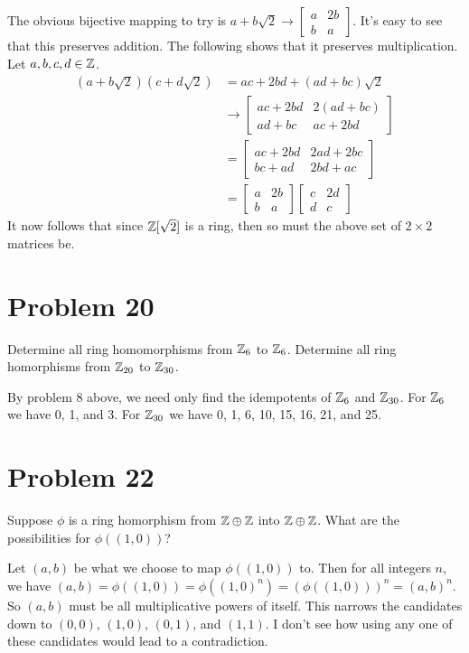 \documentclass{article}
\begin{document}
The obvious bijective mapping to try is $a+b\sqrt{2}\to\left[\begin{array}{cc}a&2b\\b&a\end{array}\right]$.
It's easy to see that this preserves addition.  The following shows
that it preserves multiplication.  Let $a,b,c,d\in\mathbb{Z}$.
\begin{align*}
(a+b\sqrt{2})(c+d\sqrt{2}) &= ac+2bd+(ad+bc)\sqrt{2} \\
 &\to\left[\begin{array}{cc}ac+2bd&2(ad+bc)\\ad+bc&ac+2bd\end{array}\right] \\
 &=\left[\begin{array}{cc}ac+2bd&2ad+2bc\\bc+ad&2bd+ac\end{array}\right] \\
 &=\left[\begin{array}{cc}a&2b\\b&a\end{array}\right]
\left[\begin{array}{cc}c&2d\\d&c\end{array}\right]
\end{align*}
It now follows that since $\mathbb{Z}[\sqrt{2}]$ is a ring, then so must the above
set of $2\times 2$ matrices be.

\section*{Problem 20}

Determine all ring homomorphisms from $\mathbb{Z}_6$ to $\mathbb{Z}_6$.  Determine all
ring homorphisms from $\mathbb{Z}_{20}$ to $\mathbb{Z}_{30}$.

By problem 8 above, we need only find the idempotents of $\mathbb{Z}_6$ and $\mathbb{Z}_{30}$.
For $\mathbb{Z}_6$ we have 0, 1, and 3.  For $\mathbb{Z}_{30}$ we have 0, 1, 6, 10, 15, 16,
21, and 25.

\pagebreak
\section*{Problem 22}

Suppose $\phi$ is a ring homorphism from $\mathbb{Z}\oplus\mathbb{Z}$ into $\mathbb{Z}\oplus\mathbb{Z}$.
What are the possibilities for $\phi((1,0))$?

Let $(a,b)$ be what we choose to map $\phi((1,0))$ to.
Then for all integers $n$, we have
$(a,b)=\phi((1,0))=\phi((1,0)^n)=(\phi((1,0)))^n=(a,b)^n$.
So $(a,b)$ must be all multiplicative powers of itself.
This narrows the candidates down to $(0,0)$, $(1,0)$, $(0,1)$,
and $(1,1)$.  I don't see how using any one of these candidates
would lead to a contradiction.
\end{document}
